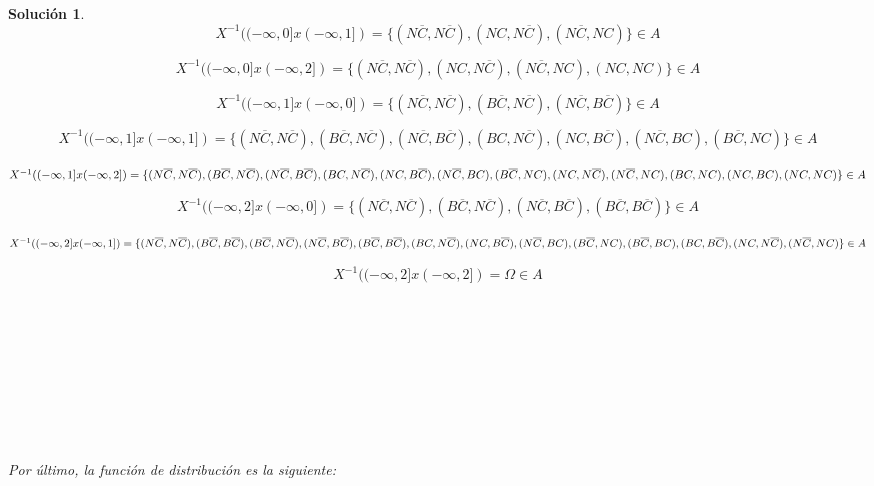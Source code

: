 \documentclass[11pt, a4paper]{article}
\newif\IfInSansMode
\newcommand{\W}{\Omega}
\theoremstyle{theorem-style}
\theoremstyle{definition-style}
\theoremstyle{remark-style}
\newtheorem*{sol}{Solución}
\theoremstyle{example-style}
\begin{document}
\begin{sol}
$$X^{-1}((-\infty,0]x(-\infty,1]) = \{(N\overline{C},N\overline{C}),(NC,N\overline{C}),(N\overline{C},NC)\} \in A $$

$$X^{-1}((-\infty,0]x(-\infty,2]) = \{(N\overline{C},N\overline{C}),(NC,N\overline{C}),(N\overline{C},NC),(NC,NC)\} \in A $$

$$X^{-1}((-\infty,1]x(-\infty,0]) = \{(N\overline{C},N\overline{C}),(B\overline{C},N\overline{C}),(N\overline{C},B\overline{C})\} \in A $$

$$X^{-1}((-\infty,1]x(-\infty,1]) = \{(N\overline{C},N\overline{C}),(B\overline{C},N\overline{C}),(N\overline{C},B\overline{C}),(BC,N\overline{C}),(NC,B\overline{C}),(N\overline{C},BC),(B\overline{C},NC)\} \in A $$

$X^{-1}((-\infty,1]x(-\infty,2]) = \{(N\overline{C},N\overline{C}),(B\overline{C},N\overline{C}),(N\overline{C},B\overline{C}),\\(BC,N\overline{C}),(NC,B\overline{C}),(N\overline{C},BC),(B\overline{C},NC),(NC,N\overline{C}),(N\overline{C},NC),(BC,NC),(NC,BC),(NC,NC)\} \in A $ 

$$X^{-1}((-\infty,2]x(-\infty,0]) = \{(N\overline{C},N\overline{C}),(B\overline{C},N\overline{C}),(N\overline{C},B\overline{C}),(B\overline{C},B\overline{C})\} \in A $$

$X^{-1}((-\infty,2]x(-\infty,1]) = \{(N\overline{C},N\overline{C}),(B\overline{C},B\overline{C}),(B\overline{C},N\overline{C}),(N\overline{C},B\overline{C}),(B\overline{C},B\overline{C}),\\(BC,N\overline{C}),(NC,B\overline{C}),(N\overline{C},BC),(B\overline{C},NC),(B\overline{C},BC),(BC,B\overline{C}),(NC,N\overline{C}),(N\overline{C},NC)\} \in A $

$$X^{-1}((-\infty,2]x(-\infty,2]) = \W \in A $$ \\ \\ \\ \\ \\ \\ \\ \\ \\

Por último, la función de distribución es la siguiente:


\end{sol}
\end{document}

